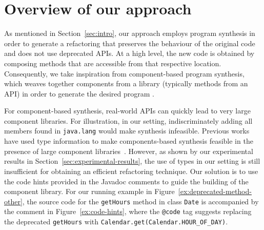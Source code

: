 \documentclass[sigconf,review,anonymous]{acmart}
\begin{document}
\section{Overview of our approach} \label{sec:overview}

As mentioned in Section~\ref{sec:intro}, our approach employs program synthesis
in order to generate a refactoring that
preserves the behaviour of the original code and
does not use deprecated APIs.
At a high level, the new code is obtained by composing methods
that are accessible from that respective location. 
Consequently, we take inspiration from component-based program synthesis,
which weaves together components from a library
(typically methods from an API) in order to generate the desired program \cite{DBLP:conf/icse/JhaGST10,DBLP:conf/pldi/GulwaniJTV11,DBLP:conf/popl/FengM0DR17}.

For component-based synthesis, real-world
APIs can quickly lead to very large component libraries. %
For illustration, in our setting, indiscriminately adding all members
found in \texttt{java.lang} would make synthesis infeasible. %
%
Previous works have used type information to make components-based synthesis
feasible in the presence of large component
libraries~\cite{DBLP:conf/popl/FengM0DR17}.  However, as shown by our
experimental results in
Section~\ref{sec:experimental-results}, the use of types in our setting is still insufficient
for obtaining an efficient refactoring technique.
%
%
Our solution is to use the code hints provided in the Javadoc comments to guide the building of the component library. For our running example in Figure~\ref{ex:deprecated-method-other}, the source code for the \texttt{getHours} method in class \texttt{Date} is accompanied by the comment in Figure~\ref{ex:code-hints}, where the \texttt{@code} tag suggests replacing the deprecated \texttt{getHours}
with \texttt{Calendar.get(Calendar.HOUR\_OF\_DAY)}.
\end{document}
